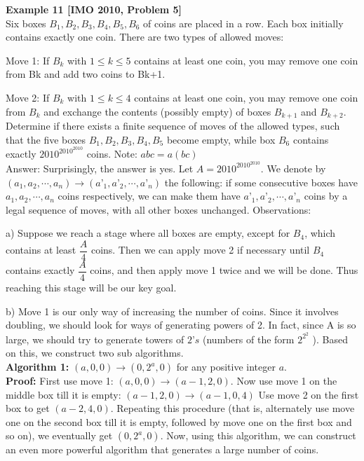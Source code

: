 \documentclass[a4paper,11pt]{book}
\begin{document}
\textbf{ Example 11 [IMO 2010, Problem 5]}\\
Six boxes $B_1, B_2, B_3, B_4, B_5, B_6$ of coins are placed in a row. Each box
initially contains exactly one coin. There are two types of allowed
moves:
\par\noindent Move 1: If $B_k$ with $1 \le k \le 5$ contains at least one coin, you may
remove one coin from Bk and add two coins to Bk+1.
\par\noindent Move 2: If $B_k$ with $1 \le k \le 4$ contains at least one coin, you may
remove one coin from $B_k$ and exchange the contents (possibly
empty) of boxes $B_{k+1}$ and $B_{k+2}$.
Determine if there exists a finite sequence of moves of the allowed
types, such that the five boxes  $B_1, B_2, B_3, B_4, B_5$ become empty,
while box $B_6$ contains exactly $ 2010^{2010^{2010}}$  coins.
Note: $abc = a(bc)$\\
Answer:
Surprisingly, the answer is yes. Let  $ A = 2010^{2010^{2010}}$. We denote by
$(a_1, a_2, \cdots, a_n) \rightarrow (a’_1, a’_2, \cdots, a’_n)$ the following: if some consecutive
boxes have $a_1, a_2, \cdots, a_n$ coins respectively, we can make them have
$a’_1, a’_2, \cdots, a’_n$ coins by a legal sequence of moves, with all other
boxes unchanged.
Observations:
\par\noindent a) Suppose we reach a stage where all boxes are empty, except
for $B_4$, which contains at least $\dfrac{A}{4}$ coins. Then we can apply
move 2 if necessary until $B_4$ contains exactly $\dfrac{A}{4}$ coins, and
then apply move 1 twice and we will be done. Thus reaching
this stage will be our key goal.
\par\noindent b) Move 1 is our only way of increasing the number of coins.
Since it involves doubling, we should look for ways of
generating powers of 2. In fact, since A is so large, we should
try to generate towers of $2’s$ (numbers of the form $2^{2^{2}}$ ).
Based on this, we construct two sub algorithms.\\

\textbf{ Algorithm 1:} $(a, 0, 0) \rightarrow (0, 2^a, 0) $ for any positive integer $a$.\\
\textbf{ Proof:}  First use move 1: $(a, 0, 0) \rightarrow (a-1, 2, 0)$.
Now use move 1 on the middle box till it is empty: $(a-1, 2, 0) \rightarrow
(a-1, 0, 4)$
Use move 2 on the first box to get $(a-2, 4, 0)$.
Repeating this procedure (that is, alternately use move one on the
second box till it is empty, followed by move one on the first box
and so on), we eventually get $(0, 2^a, 0)$.
Now, using this algorithm, we can construct an even more
powerful algorithm that generates a large number of coins.
\end{document}

